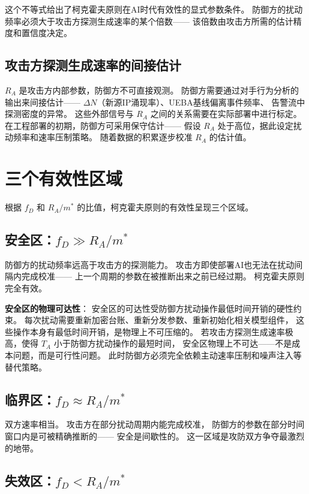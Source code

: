 \documentclass[11pt,a4paper]{article}
\begin{document}
这个不等式给出了柯克霍夫原则在AI时代有效性的显式参数条件。
防御方的扰动频率必须大于攻击方探测生成速率的某个倍数——
该倍数由攻击方所需的估计精度和置信度决定。

\subsection{攻击方探测生成速率的间接估计}

\(R_A\) 是攻击方内部参数，防御方不可直接观测。
防御方需要通过对手行为分析的输出来间接估计——
\(\Delta N\)（新源IP涌现率）、UEBA基线偏离事件频率、
告警流中探测密度的异常。
这些外部信号与 \(R_A\) 之间的关系需要在实际部署中进行标定。
在工程部署的初期，防御方可采用保守估计——
假设 \(R_A\) 处于高位，据此设定扰动频率和速率压制策略。
随着数据的积累逐步校准 \(R_A\) 的估计值。

\section{三个有效性区域}

根据 \(f_D\) 和 \(R_A / m^*\) 的比值，柯克霍夫原则的有效性呈现三个区域。

\subsection{安全区：\(f_D \gg R_A / m^*\)}

防御方的扰动频率远高于攻击方的探测能力。
攻击方即使部署AI也无法在扰动间隔内完成校准——
上一个周期的参数在被推断出来之前已经过期。
柯克霍夫原则完全有效。

\textbf{安全区的物理可达性}：
安全区的可达性受防御方扰动操作最低时间开销的硬性约束。
每次扰动需要重新加密台账、重新分发参数、重新初始化相关模型组件，
这些操作本身有最低时间开销，是物理上不可压缩的。
若攻击方探测生成速率极高，使得 \(T_A\) 小于防御方扰动操作的最短时间，
安全区物理上不可达——不是成本问题，而是可行性问题。
此时防御方必须完全依赖主动速率压制和噪声注入等替代策略。

\subsection{临界区：\(f_D \approx R_A / m^*\)}

双方速率相当。
攻击方在部分扰动周期内能完成校准，
防御方的参数在部分时间窗口内是可被精确推断的——
安全是间歇性的。
这一区域是攻防双方争夺最激烈的地带。

\subsection{失效区：\(f_D < R_A / m^*\)}
\end{document}
